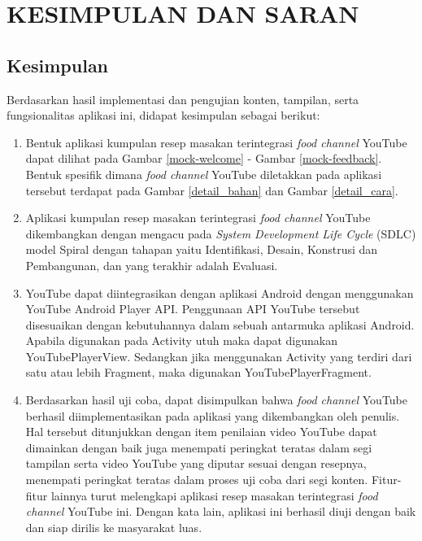 
\chapter{KESIMPULAN DAN SARAN}

\section{Kesimpulan}
	Berdasarkan hasil implementasi dan pengujian konten, tampilan, serta fungsionalitas aplikasi ini, didapat kesimpulan sebagai berikut:

	\begin{enumerate}
		\item Bentuk aplikasi kumpulan resep masakan terintegrasi \textit{food channel} YouTube dapat dilihat pada Gambar \ref{mock-welcome} - Gambar \ref{mock-feedback}. Bentuk spesifik dimana \textit{food channel} YouTube diletakkan pada aplikasi tersebut terdapat pada Gambar \ref{detail_bahan} dan Gambar \ref{detail_cara}.
		
		\item Aplikasi kumpulan resep masakan terintegrasi \textit{food channel} YouTube dikembangkan dengan mengacu pada \textit{System Development Life Cycle} (SDLC) model Spiral dengan tahapan yaitu Identifikasi, Desain, Konstrusi dan Pembangunan, dan yang terakhir adalah Evaluasi.
		
		\item YouTube dapat diintegrasikan dengan aplikasi Android dengan menggunakan YouTube Android Player API. Penggunaan API YouTube tersebut disesuaikan dengan kebutuhannya dalam sebuah antarmuka aplikasi Android. Apabila digunakan pada Activity utuh maka dapat digunakan YouTubePlayerView. Sedangkan jika menggunakan Activity yang terdiri dari satu atau lebih Fragment, maka digunakan YouTubePlayerFragment. 

		\item Berdasarkan hasil uji coba, dapat disimpulkan bahwa \textit{food channel} YouTube berhasil diimplementasikan pada aplikasi yang dikembangkan oleh penulis. Hal tersebut ditunjukkan dengan item penilaian video YouTube dapat dimainkan dengan baik juga menempati peringkat teratas dalam segi tampilan serta video YouTube yang diputar sesuai dengan resepnya, menempati peringkat teratas dalam proses uji coba dari segi konten. Fitur-fitur lainnya turut melengkapi aplikasi resep masakan terintegrasi \textit{food channel} YouTube ini. Dengan kata lain, aplikasi ini berhasil diuji dengan baik dan siap dirilis ke masyarakat luas. 
	\end{enumerate}


